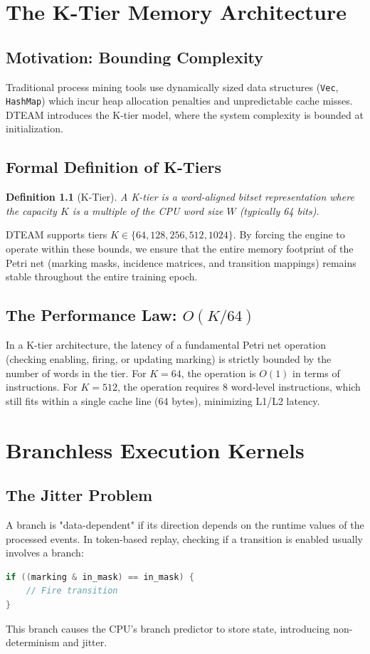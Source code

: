 \documentclass[12pt,a4paper]{report}
\newtheorem{definition}{Definition}
\begin{document}
\chapter{The K-Tier Memory Architecture}
\section{Motivation: Bounding Complexity}
Traditional process mining tools use dynamically sized data structures (\texttt{Vec}, \texttt{HashMap}) which incur heap allocation penalties and unpredictable cache misses. DTEAM introduces the K-tier model, where the system complexity is bounded at initialization.

\section{Formal Definition of K-Tiers}
\begin{definition}[K-Tier]
A K-tier is a word-aligned bitset representation where the capacity $K$ is a multiple of the CPU word size $W$ (typically 64 bits). 
\end{definition}

DTEAM supports tiers $K \in \{64, 128, 256, 512, 1024\}$. By forcing the engine to operate within these bounds, we ensure that the entire memory footprint of the Petri net (marking masks, incidence matrices, and transition mappings) remains stable throughout the entire training epoch.

\section{The Performance Law: $O(K/64)$}
In a K-tier architecture, the latency of a fundamental Petri net operation (checking enabling, firing, or updating marking) is strictly bounded by the number of words in the tier. 
For $K=64$, the operation is $O(1)$ in terms of instructions. For $K=512$, the operation requires 8 word-level instructions, which still fits within a single cache line (64 bytes), minimizing L1/L2 latency.

\chapter{Branchless Execution Kernels}
\section{The Jitter Problem}
A branch is "data-dependent" if its direction depends on the runtime values of the processed events. In token-based replay, checking if a transition is enabled usually involves a branch:
\begin{lstlisting}[language=C]
if ((marking & in_mask) == in_mask) {
    // Fire transition
}
\end{lstlisting}
This branch causes the CPU's branch predictor to store state, introducing non-determinism and jitter.
\end{document}
